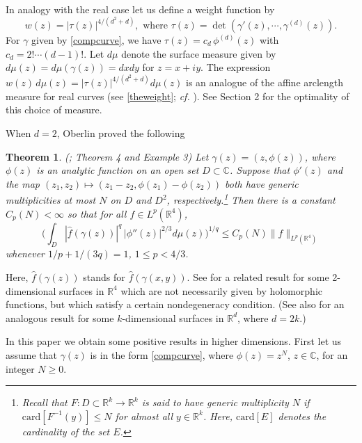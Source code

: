 \documentclass[11 pt]{amsart}
\theoremstyle{plain}
\newtheorem{theorem}{Theorem}[section]
\numberwithin{equation}{section}
\theoremstyle{plain}
\numberwithin{equation}{section}
\theoremstyle{remark}
\begin{document}
In analogy with the real case let us define a weight function by
\begin{equation} \label{compwt}
w(z) = |\tau (z)|^{4/(d^2+d)}, \text{ where } \tau(z) = \det (\gamma '(z), \cdots, \gamma^{(d)}(z)) .
\end{equation}
For $\gamma$ given by \eqref{compcurve}, we have $\tau(z) = c_d \, \phi^{(d)}(z)$ with $c_d = 2! \cdots (d-1)!$.
Let $d\mu$ denote the surface measure given by $d\mu(z) = d\mu (\gamma(z)) =dxdy$ for $z=x+iy$. The expression
$w(z) \, d\mu(z) = |\tau (z)|^{4/(d^2+d)} d\mu(z)$
is an analogue of the affine arclength measure for real curves (see \eqref{theweight}; {\it cf.} \cite{DM1,DM2,BOS1}). See Section 2 for the optimality of this choice of measure.

\medskip

When $d=2$, Oberlin \cite{Ob} proved the following
\begin{theorem}{\rm (\cite{Ob}; Theorem 4 and Example 3)} \label{comprestthm-2}
Let $\gamma(z)= (z, \phi(z))$, where $\phi(z)$ is an analytic
function on an open set $D\subset {{\mathbb {C}}}$. Suppose that $\phi'(z)$
and the map $(z_1, z_2)\mapsto (z_1 - z_2, \phi(z_1) - \phi(z_2))$
both have generic multiplicities at most $N$ on $D$ and $D^2$,
respectively.\footnote{Recall that $F : D \subset {\mathbb R}^k \rightarrow {\mathbb R}^k$ is said to have {{\it {generic multiplicity $N$}}} if $\textrm{card}[F^{-1}(y)] \leq N$ for almost all $y \in {\mathbb R}^k$. Here, $\textrm{card}[E]$ denotes the cardinality of the set $E$.}
Then there is a constant $C_p(N)<\infty$ so that for all $f\in
L^{p}({{\mathbb {R}}}^{4})$,
\begin{equation} \label{comp-2}
\Big(\int_{D}
 |\widehat f (\gamma (z) )|^q \,|\phi''(z)|^{2/3} d\mu(z)\Big)^{1/q} \le
C_p (N)\|f\|_{L^{p}({{\mathbb {R}}}^4)}
\end{equation}
whenever $1/p + 1/(3q) = 1$, $1\le p<4/3$.
\end{theorem}

Here, $\widehat f (\gamma (z) )$ stands for $\widehat f (\gamma (x,y) )$.
See \cite{Ch} for a related result for some 2-dimensional surfaces in ${{\mathbb {R}}}^{4}$ which are not necessarily given by holomorphic functions, but which satisfy a certain nondegeneracy condition. (See also \cite{DG} for an analogous result for some $k$-dimensional surfaces in ${{\mathbb {R}}}^d$, where $d=2k$.)

In this paper we obtain some positive results in higher dimensions.
First let us assume that
$\gamma(z)$ is in the form \eqref{compcurve}, where $\phi(z) = z^N$,
$z\in {{\mathbb {C}}}$, for an integer $N \geq 0$.
\end{document}
